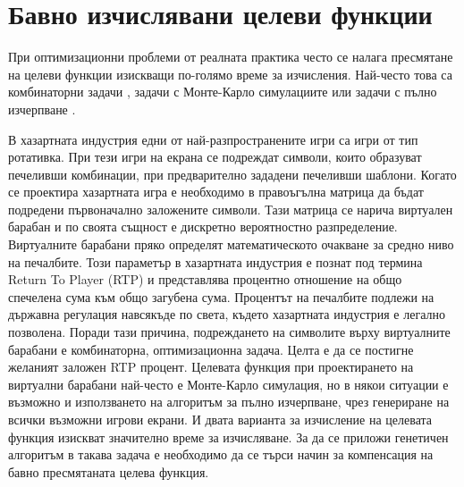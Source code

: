 \section{Бавно изчислявани целеви функции}

При оптимизационни проблеми от реалната практика често се налага пресмятане на целеви функции изискващи по-голямо време за изчисления. Най-често това са комбинаторни задачи \cite{Koleva-01}, задачи с Монте-Карло симулациите или задачи с пълно изчерпване \cite{Keremedchiev-01}.

В хазартната индустрия едни от най-разпространените игри са игри от тип ротативка. При тези игри на екрана се подреждат символи, които образуват печеливши комбинации, при предварително зададени печеливши шаблони. Когато се проектира хазартната игра е необходимо в правоъгълна матрица да бъдат подредени първоначално заложените символи. Тази матрица се нарича виртуален барабан и по своята същност е дискретно вероятностно разпределение. Виртуалните барабани пряко определят математическото очакване за средно ниво на печалбите. Този параметър в хазартната индустрия е познат под термина Return To Player (RTP) и представлява процентно отношение на общо спечелена сума към общо загубена сума. Процентът на печалбите подлежи на държавна регулация навсякъде по света, където хазартната индустрия е легално позволена. Поради тази причина, подреждането на символите върху виртуалните барабани е комбинаторна, оптимизационна задача. Целта е да се постигне желаният заложен RTP процент. Целевата функция при проектирането на виртуални барабани най-често е Монте-Карло симулация, но в някои ситуации е възможно и използването на алгоритъм за пълно изчерпване, чрез генериране на всички възможни игрови екрани. И двата варианта за изчисление на целевата функция изискват значително време за изчисляване. За да се приложи генетичен алгоритъм в такава задача е необходимо да се търси начин за компенсация на бавно пресмятаната целева функция. 

